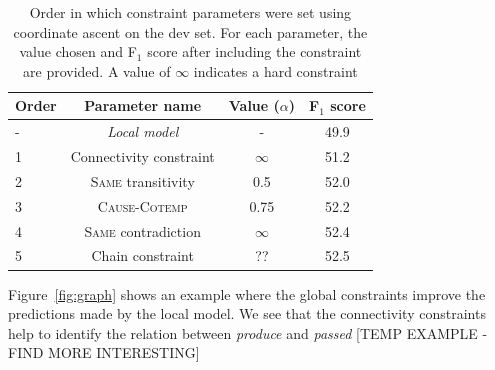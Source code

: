 \begin{table}[t]
{\footnotesize
\begin{tabular}{| l | c | c | c |}
\hline
    \textbf{Order} & \textbf{Parameter name} & \textbf{Value} ($\alpha$)& \textbf{F$_1$ score} \\
\hline
\hline
- & \emph{Local model} & - & 49.9 \\
1 & Connectivity constraint & $\infty$ & 51.2 \\
2 & \textsc{Same} transitivity &  0.5 & 52.0 \\
3 & \textsc{Cause}-\textsc{Cotemp} & 0.75 & 52.2\\
4 & \textsc{Same} contradiction & $\infty$ & 52.4\\
5 & Chain constraint & ?? & 52.5\\
\hline
\end{tabular}}
\caption{Order in which constraint parameters were set using coordinate ascent on the dev set. For each parameter, the value chosen and F$_1$ score after including the constraint are provided. A value of $\infty$ indicates a hard constraint}
\label{tab:paramtuning}
\end{table}

Figure~\ref{fig:graph} shows an example where the global constraints improve the predictions made by the local model. We see that the connectivity constraints help to identify the relation between \emph{produce} and \emph{passed} [TEMP EXAMPLE - FIND MORE INTERESTING]
